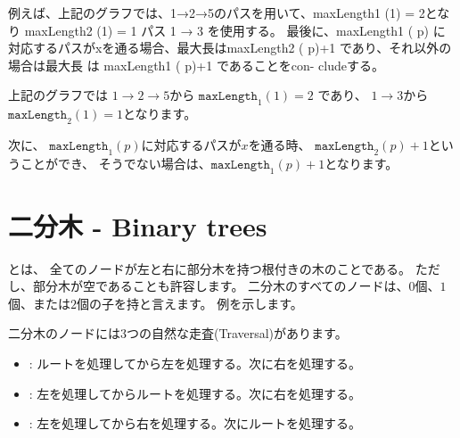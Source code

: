例えば、上記のグラフでは、1→2→5のパスを用いて、maxLength1 (1) = 2となり maxLength2 (1) = 1 パス 1 → 3 を使用する。
最後に、maxLength1 ( p) に対応するパスがxを通る場合、最大長はmaxLength2 ( p)+1 であり、それ以外の場合は最大長 は maxLength1 ( p)+1 であることをcon- cludeする。

上記のグラフでは
$1 \rightarrow 2 \rightarrow 5$から
$\texttt{maxLength}_1(1)=2$
であり、
$1 \rightarrow 3$から
$\texttt{maxLength}_2(1)=1$となります。

次に、
$\texttt{maxLength}_1(p)$に対応するパスが$x$を通る時、
$\texttt{maxLength}_2(p)+1$ということができ、
そうでない場合は、$\texttt{maxLength}_1(p)+1$となります。


\section{二分木 - Binary trees}


\begin{samepage}

とは、
全てのノードが左と右に部分木を持つ根付きの木のことである。
ただし、部分木が空であることも許容します。
二分木のすべてのノードは、$0$個、$1$個、または$2$個の子を持と言えます。
例を示します。

\begin{center}
\end{center}
\end{samepage}

二分木のノードには3つの自然な走査(Traversal)があります。
\begin{itemize}
\item {}: ルートを処理してから左を処理する。次に右を処理する。
\item {}: 左を処理してからルートを処理する。次に右を処理する。
\item {}: 左を処理してから右を処理する。次にルートを処理する。
\end{itemize}

